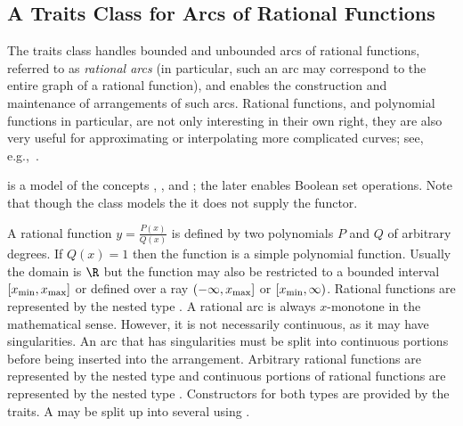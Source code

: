 
\subsection{A Traits Class for Arcs of Rational Functions\label{arr_ssec:tr_ratfunc}}

The traits class
 handles
bounded and unbounded arcs of rational functions, referred to as
\emph{rational arcs} (in particular, such an arc may correspond to the
entire graph of a rational function), and enables the construction and
maintenance of arrangements of such arcs. Rational functions, and
polynomial functions in particular, are not only interesting in their
own right, they are also very useful for approximating or
interpolating more complicated curves; see,
e.g.,~\cite[Chapter~3]{cgal:ptvf-nrcpp-02}.

 is a model
of the concepts ,
,
 and
; the later enables
Boolean set operations. Note that though the class models the
 it does not supply the
 functor.

A rational function $y = \frac{P(x)}{Q(x)}$ is defined by two
polynomials $P$ and $Q$ of arbitrary degrees.  If $Q(x) = 1$ then
the function is a simple polynomial function. Usually the domain is
$\R$ but the function may also be restricted to a bounded interval
$[x_{\rm min}, x_{\rm max}]$ or defined over a ray
$(-\infty, x_{\rm max}]$ or $[x_{\rm min}, \infty)$. Rational
functions are represented by the nested type .
A rational arc is always $x$-monotone in the mathematical
sense. However, it is not necessarily continuous, as it may have
singularities. An arc that has singularities must 
be split into continuous portions before being inserted into the
arrangement. Arbitrary rational functions are represented by the 
nested type  and continuous portions of rational
functions are represented by the nested type
. Constructors for both types are provided by
the traits. A  may be split up into several
 using .

